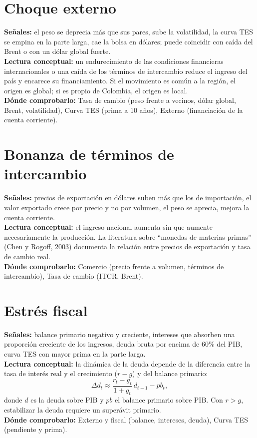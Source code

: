 \section{Choque externo}
\textbf{Señales:} el peso se deprecia más que sus pares, sube la volatilidad, la curva TES se empina en la parte larga,
cae la bolsa en dólares; puede coincidir con caída del Brent o con un dólar global fuerte.\\
\textbf{Lectura conceptual:} un endurecimiento de las condiciones financieras internacionales o una caída de los
términos de intercambio reduce el ingreso del país y encarece su financiamiento. Si el movimiento es común a la región,
el origen es global; si es propio de Colombia, el origen es local.\\
\textbf{Dónde comprobarlo:} Tasa de cambio (peso frente a vecinos, dólar global, Brent, volatilidad), Curva TES
(prima a 10 años), Externo (financiación de la cuenta corriente).

\section{Bonanza de términos de intercambio}
\textbf{Señales:} precios de exportación en dólares suben más que los de importación, el valor exportado crece por
precio y no por volumen, el peso se aprecia, mejora la cuenta corriente.\\
\textbf{Lectura conceptual:} el ingreso nacional aumenta sin que aumente necesariamente la producción. La literatura
sobre ``monedas de materias primas'' (Chen y Rogoff, 2003) documenta la relación entre precios de exportación y tasa de
cambio real.\\
\textbf{Dónde comprobarlo:} Comercio (precio frente a volumen, términos de intercambio), Tasa de cambio (ITCR, Brent).

\section{Estrés fiscal}
\textbf{Señales:} balance primario negativo y creciente, intereses que absorben una proporción creciente de los
ingresos, deuda bruta por encima de 60\% del PIB, curva TES con mayor prima en la parte larga.\\
\textbf{Lectura conceptual:} la dinámica de la deuda depende de la diferencia entre la tasa de interés real y el
crecimiento ($r-g$) y del balance primario:
\[
\Delta d_t \approx \frac{r_t-g_t}{1+g_t}\,d_{t-1} - pb_t,
\]
donde $d$ es la deuda sobre PIB y $pb$ el balance primario sobre PIB. Con $r>g$, estabilizar la deuda requiere un
superávit primario.\\
\textbf{Dónde comprobarlo:} Externo y fiscal (balance, intereses, deuda), Curva TES (pendiente y prima).

